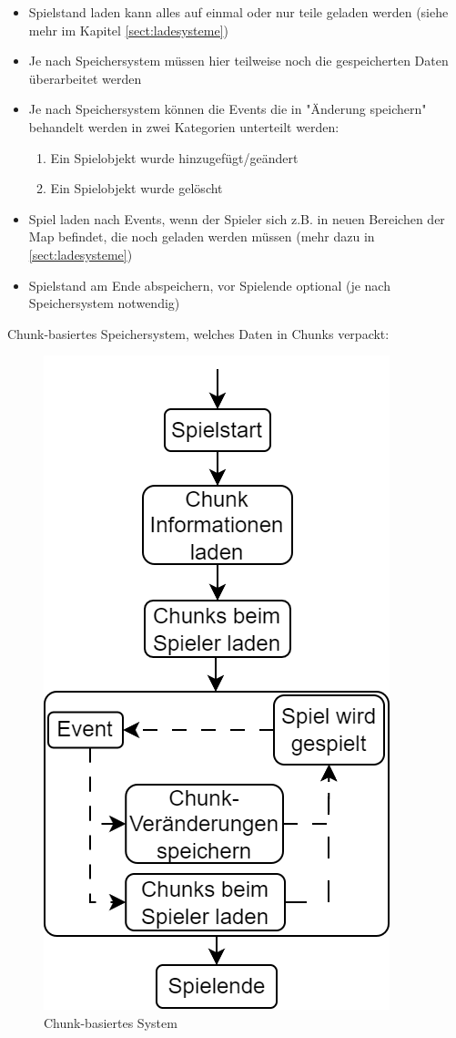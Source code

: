\begin{itemize}
    \item Spielstand laden kann alles auf einmal oder nur teile geladen werden (siehe mehr im Kapitel \ref{sect:ladesysteme})
    \item Je nach Speichersystem müssen hier teilweise noch die gespeicherten Daten überarbeitet werden
    \item Je nach Speichersystem können die Events die in "Änderung speichern" behandelt werden in zwei Kategorien unterteilt werden:
    \begin{enumerate}
        \item Ein Spielobjekt wurde hinzugefügt/geändert
        \item Ein Spielobjekt wurde gelöscht
    \end{enumerate}
    \item Spiel laden nach Events, wenn der Spieler sich z.B. in neuen Bereichen der Map befindet, die noch geladen werden müssen (mehr dazu in \ref{sect:ladesysteme})
    \item Spielstand am Ende abspeichern, vor Spielende optional (je nach Speichersystem notwendig)
\end{itemize}

Chunk-basiertes Speichersystem, welches Daten in Chunks verpackt:
\begin{figure}[H]
    \centering
    \includegraphics[scale=0.5]{images/Chunkbasiert.png}
    \caption{Chunk-basiertes System}
    \label{fig:chunkBasedSystem}
\end{figure}

